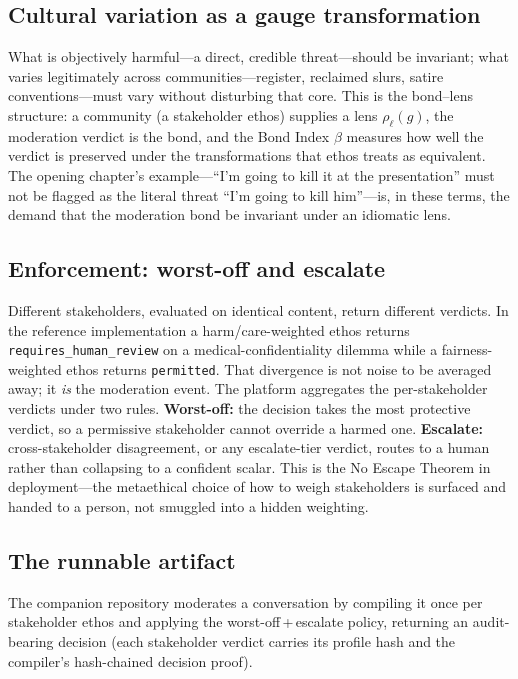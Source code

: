 \documentclass[12pt,letterpaper,twoside,openright]{book}
\theoremstyle{plain}
\theoremstyle{definition}
\theoremstyle{remark}
\begin{document}
\subsection{Cultural variation as a gauge transformation}
What is objectively harmful---a direct, credible threat---should be invariant; what varies legitimately across communities---register, reclaimed slurs, satire conventions---must vary without disturbing that core. This is the bond--lens structure: a community (a stakeholder ethos) supplies a lens $\rho_\ell(g)$, the moderation verdict is the bond, and the Bond Index $\beta$ measures how well the verdict is preserved under the transformations that ethos treats as equivalent. The opening chapter's example---``I'm going to kill it at the presentation'' must not be flagged as the literal threat ``I'm going to kill him''---is, in these terms, the demand that the moderation bond be invariant under an idiomatic lens.

\subsection{Enforcement: worst-off and escalate}
Different stakeholders, evaluated on identical content, return different verdicts. In the reference implementation a harm/care-weighted ethos returns \texttt{requires\_human\_review} on a medical-confidentiality dilemma while a fairness-weighted ethos returns \texttt{permitted}. That divergence is not noise to be averaged away; it \emph{is} the moderation event. The platform aggregates the per-stakeholder verdicts under two rules. \textbf{Worst-off:} the decision takes the most protective verdict, so a permissive stakeholder cannot override a harmed one. \textbf{Escalate:} cross-stakeholder disagreement, or any escalate-tier verdict, routes to a human rather than collapsing to a confident scalar. This is the No Escape Theorem in deployment---the metaethical choice of how to weigh stakeholders is surfaced and handed to a person, not smuggled into a hidden weighting.

\subsection{The runnable artifact}
The companion repository moderates a conversation by compiling it once per stakeholder ethos and applying the worst-off\,+\,escalate policy, returning an audit-bearing decision (each stakeholder verdict carries its profile hash and the compiler's hash-chained decision proof).
\end{document}
